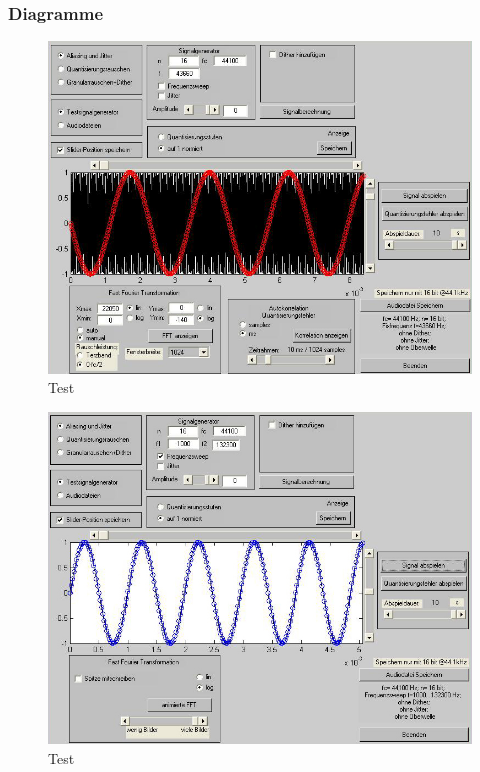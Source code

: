 \subsubsection{Diagramme}
\begin{figure}[h!]
\centering
\includegraphics[width=\columnwidth]{figures/Aufg1/1_1.JPG} 
\caption{Test}
\end{figure}

\begin{figure}[h!]
\centering
\includegraphics[width=\columnwidth]{figures/Aufg1/1_2.JPG} 
\caption{Test}
\end{figure}


